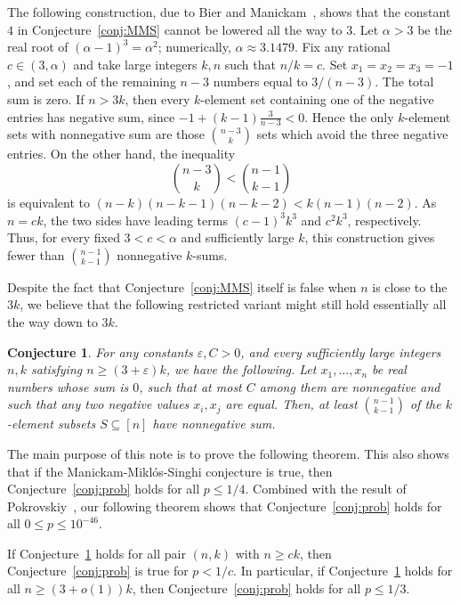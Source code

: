 \documentclass[11pt]{amsart}
\newtheorem{conjecture}[theorem]{\bf Conjecture}
\theoremstyle{definition}
\def\eps{\varepsilon}
\begin{document}
The following construction, due to Bier and Manickam~\cite{BM87}, shows that the constant $4$ in Conjecture~\ref{conj:MMS} cannot be lowered all the way to $3$.  Let $\alpha>3$ be the real root of $(\alpha-1)^3=\alpha^2$; numerically, $\alpha\approx 3.1479$. Fix any rational $c\in (3, \alpha)$ and take large integers $k, n$ such that $n/k=c$. Set $x_1=x_2=x_3=-1$, and set each of the remaining $n-3$ numbers equal to $3/(n-3)$. The total sum is zero. If $n>3k$, then every $k$-element set containing one of the negative entries has negative sum, since $-1+(k-1)\frac{3}{n-3}<0$.
Hence the only $k$-element sets with nonnegative sum are those $\binom{n-3}{k}$ sets which avoid the three negative entries. On the other hand, the inequality
\[
  \binom{n-3}{k}<\binom{n-1}{k-1}
\]
is equivalent to $(n-k)(n-k-1)(n-k-2)<k(n-1)(n-2)$.
As $n=ck$, the two sides have leading terms $(c-1)^3k^3$ and $c^2k^3$, respectively. Thus, for every fixed $3<c<\alpha$ and sufficiently large $k$, this construction gives fewer than $\binom{n-1}{k-1}$ nonnegative $k$-sums.

Despite the fact that Conjecture~\ref{conj:MMS} itself is false when $n$ is close to the $3k$, we believe that the following restricted variant might still hold essentially all the way down to $3k$.

\begin{conjecture}    
\label{q:MMS_variant}
For any constants $\eps, C>0$, and every sufficiently large integers $n, k$ satisfying $n\geq (3+\eps)k$, we have the following. Let $x_1, \dots, x_n$ be real numbers whose sum is $0$, such that at most $C$ among them are nonnegative and such that any two negative values $x_i, x_j$ are equal. Then, at least $\binom{n-1}{k-1}$ of the $k$-element subsets $S\subseteq [n]$ have nonnegative sum.
\end{conjecture}

The main purpose of this note is to prove the following theorem. This also shows that if the Manickam-Mikl\'os-Singhi conjecture is true, then Conjecture~\ref{conj:prob} holds for all $p\leq 1/4$. Combined with the result of Pokrovskiy~\cite{Pok15}, our following theorem shows that Conjecture~\ref{conj:prob} holds for all $0\leq p\leq 10^{-46}$.

\begin{theorem}\label{thm:main}
If Conjecture~\ref{q:MMS_variant} holds for all pair $(n, k)$ with $n\geq ck$, then Conjecture~\ref{conj:prob} is true for $p< 1/c$. In particular, if Conjecture~\ref{q:MMS_variant} holds for all $n\geq (3+o(1))k$, then Conjecture~\ref{conj:prob} holds for all $p\leq 1/3$.
\end{theorem}
\end{document}
